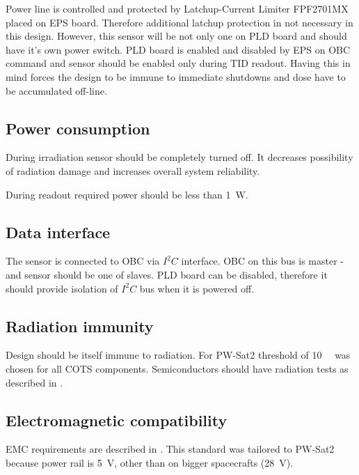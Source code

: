         Power line is controlled and protected by Latchup-Current Limiter FPF2701MX placed on EPS board. Therefore additional latchup protection in not necessary in this design. However, this sensor will be not only one on PLD board and should have it's own power switch. PLD board is enabled and disabled by EPS on OBC command and sensor should be enabled only during TID readout. Having this in mind forces the design to be immune to immediate shutdowns and dose have to be accumulated off-line.

    \subsection{Power consumption}
        During irradiation sensor should be completely turned off. It decreases possibility of radiation damage and increases overall system reliability.

        During readout required power should be less than \SI{1}{W}.

    \subsection{Data interface}
        The sensor is connected to OBC via $I^2C$ interface. OBC on this bus is master - and sensor should be one of slaves. PLD board can be disabled, therefore it should provide isolation of $I^2C$ bus when it is powered off.

    \subsection{Radiation immunity}
        Design should be itself immune to radiation. For PW-Sat2 threshold of \SI{10}{\kilo\rad} was chosen for all COTS components. Semiconductors should have radiation tests as described in \cite{ESCIES_TID_test_method}.

    \subsection{Electromagnetic compatibility}
        EMC requirements are described in \cite{ECSS_E_ST_20_07C}. This standard was tailored to PW-Sat2 because power rail is \SI{+5}{\volt}, other than on bigger spacecrafts (\SI{+28}{\volt}).

